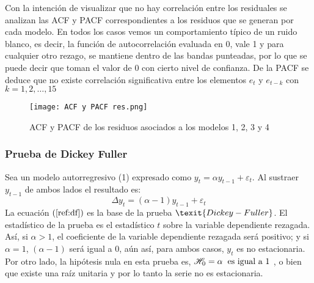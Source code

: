 \documentclass{article}
\theoremstyle{remark}
\begin{document}
Con la intención de visualizar que  no hay correlación entre los residuales se analizan las ACF y PACF correspondientes a los residuos que se generan por cada modelo. En todos los casos vemos un comportamiento típico de un ruido blanco, es decir, la función de autocorrelación evaluada en 0, vale 1 y para cualquier otro rezago, se mantiene dentro de las bandas punteadas,  por lo que se puede decir que toman el valor de 0 con cierto nivel de confianza. De la PACF se deduce que no existe correlación significativa entre los elementos  $e_t$ y $e_{t-k}$ con $k = 1, 2, \dots, 15$

\begin{figure}[H]
\centering
\texttt{[image: ACF y PACF res.png]}
\caption{ACF y PACF de los residuos asociados a los modelos 1, 2, 3 y 4}
\label{acpcresiduos}
\end{figure}

\subsubsection{Prueba de Dickey Fuller}
Sea un modelo autorregresivo (1) expresado como $y_t=\alpha y_{t-1} + \varepsilon_t$. Al sustraer $y_{t-1}$ de ambos lados el resultado es: 
\begin{equation}
\label{ref:df}
    \Delta y_t = (\alpha-1)y_{t-1} + \varepsilon_t 
\end{equation}
La ecuación $(\ref{ref:df})$ es la base de la prueba $\texit{Dickey-Fuller}$. El estadístico de la prueba es el estadístico $t$ sobre la variable dependiente rezagada. Así, si $\alpha > 1$, el coeficiente de la variable dependiente rezagada será positivo; y si  $\alpha = 1$, $(\alpha -1)$ será igual a 0, aún así, para ambos casos, $y_t$ es no estacionaria. \\


Por otro lado, la hipótesis nula en esta prueba es, $\mathscr{H}_0= \alpha \hspace{0.2cm} \text{es igual a 1}$ , o bien que existe una raíz unitaria y por lo tanto la {serie no es estacionaria}.  \\
\end{document}
